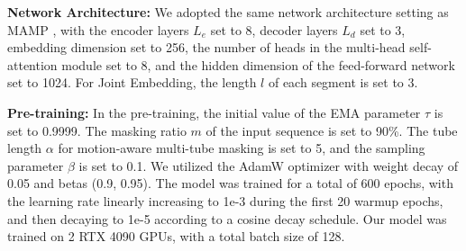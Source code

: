 \noindent \textbf{Network Architecture:}
We adopted the same network architecture setting as MAMP \cite{mao2023masked}, with the
encoder layers $L_{e}$ set to 8, decoder layers $L_{d}$ set to 3, embedding dimension
set to 256, the number of heads in the multi-head self-attention module set to 8, and
the hidden dimension of the feed-forward network set to 1024. For Joint Embedding,
the length $l$ of each segment is set to 3.

\noindent \textbf{Pre-training:}
In the pre-training, the initial value of the EMA parameter $\tau$ is set to 0.9999.
The masking ratio $m$ of the input sequence is set to 90\%.
The tube length $\alpha$ for motion-aware multi-tube masking is set to 5,
and the sampling parameter $\beta$ is set to 0.1. We utilized the AdamW optimizer
with weight decay of 0.05 and betas (0.9, 0.95). The model was trained for a total of
600 epochs, with the learning rate linearly increasing to 1e-3 during the first 20
warmup epochs, and then decaying to 1e-5 according to a cosine decay schedule.
Our model was trained on 2 RTX 4090 GPUs, with a total batch size of 128.

